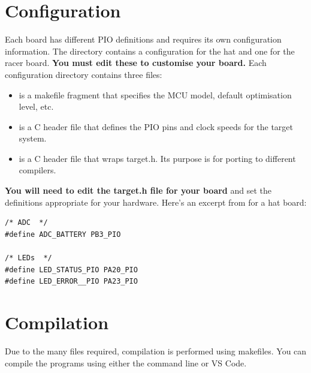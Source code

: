 \inputminted{C}{../../src/test-apps/ledflash1/ledflash1.c}


\section{Configuration}
\label{configuration}

Each board has different PIO definitions and requires its own
configuration information. The  directory contains a
configuration for the hat and one for the racer board.  \textbf{You
must edit these to customise your board.}  Each configuration
directory contains three files:

\begin{itemize}
\item
   is a makefile fragment that specifies the MCU model,
  default optimisation level, etc.
\item
   is a C header file that defines the PIO pins and
  clock speeds for the target system.
\item
   is a C header file that wraps target.h.  Its purpose
  is for porting to different compilers.
\end{itemize}

\textbf{You will need to edit the target.h file for your board} and set
the definitions appropriate for your hardware. Here's an excerpt from
 for a hat board:

\begin{verbatim}
/* ADC  */
#define ADC_BATTERY PB3_PIO

/* LEDs  */
#define LED_STATUS_PIO PA20_PIO
#define LED_ERROR__PIO PA23_PIO
\end{verbatim}


\section{Compilation}
\label{compilation}

Due to the many files required, compilation is performed using
makefiles. You can compile the programs using either the command line or
VS Code.

